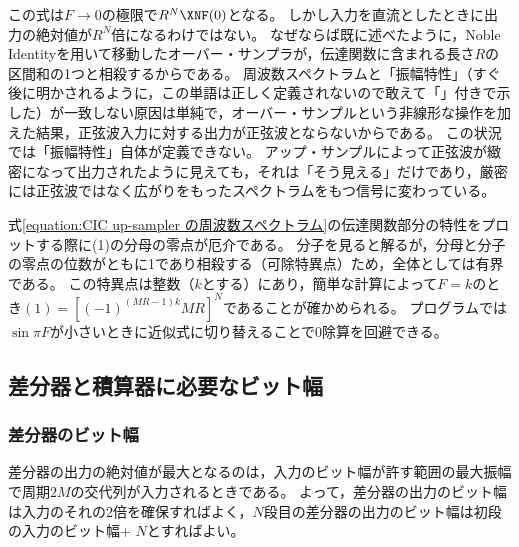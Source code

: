         この式は$F\to 0$の極限で$R^N \XNF(0)$となる。
        しかし入力を直流としたときに出力の絶対値が$R^N$倍になるわけではない。
        なぜならば既に述べたように，Noble Identityを用いて移動したオーバー・サンプラが，伝達関数に含まれる長さ$R$の区間和の1つと相殺するからである。
        周波数スペクトラムと「振幅特性」（すぐ後に明かされるように，この単語は正しく定義されないので敢えて「」付きで示した）が一致しない原因は単純で，オーバー・サンプルという非線形な操作を加えた結果，正弦波入力に対する出力が正弦波とならないからである。
        この状況では「振幅特性」自体が定義できない。
        アップ・サンプルによって正弦波が緻密になって出力されたように見えても，それは「そう見える」だけであり，厳密には正弦波ではなく広がりをもったスペクトラムをもつ信号に変わっている。
        \par
        式\eqref{equation:CIC up-sampler の周波数スペクトラム}の伝達関数部分の特性をプロットする際に(1)の分母の零点が厄介である。
        分子を見ると解るが，分母と分子の零点の位数がともに1であり相殺する（可除特異点）ため，全体としては有界である。
        この特異点は整数（$k$とする）にあり，簡単な計算によって$F=k$のとき$(1) = [(-1)^{(MR-1)k} MR]^N$であることが確かめられる。
        プログラムでは$\sin\pi F$が小さいときに近似式に切り替えることで0除算を回避できる。
    \subsection{差分器と積算器に必要なビット幅}
        \subsubsection{差分器のビット幅}
            差分器の出力の絶対値が最大となるのは，入力のビット幅が許す範囲の最大振幅で周期$2M$の交代列が入力されるときである。
            よって，差分器の出力のビット幅は入力のそれの2倍を確保すればよく，$N$段目の差分器の出力のビット幅は初段の入力のビット幅+ $N$とすればよい。
